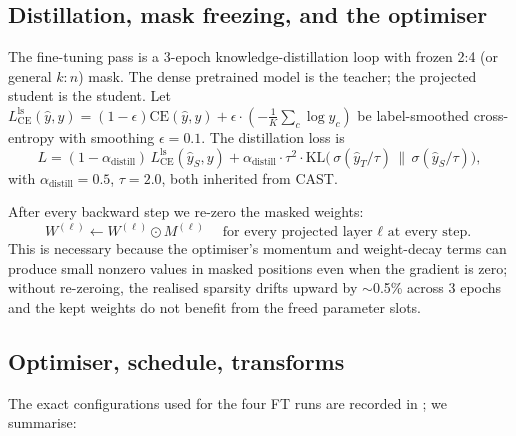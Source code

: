 \documentclass[11pt]{article}
\theoremstyle{plain}
\theoremstyle{definition}
\theoremstyle{remark}
\newcommand{\1}{\mathbf{1}}
\begin{document}
\subsection{Distillation, mask freezing, and the optimiser}

The fine-tuning pass is a 3-epoch knowledge-distillation loop with frozen 2:4 (or general $k{:}n$) mask. The dense pretrained model is the teacher; the projected student is the student. Let $L_{\mathrm{CE}}^{\mathrm{ls}}(\hat{y}, y) = (1 - \epsilon) \mathrm{CE}(\hat{y}, y) + \epsilon \cdot (-\frac1K \sum_c \log \hat{y}_c)$ be label-smoothed cross-entropy with smoothing $\epsilon = 0.1$. The distillation loss is
\begin{equation}
\label{eq:distill}
L = (1 - \alpha_{\mathrm{distill}})\, L_{\mathrm{CE}}^{\mathrm{ls}}(\hat{y}_S, y) + \alpha_{\mathrm{distill}} \cdot \tau^2 \cdot \mathrm{KL}\bigl(\,\sigma(\hat{y}_T / \tau)\, \big\|\, \sigma(\hat{y}_S / \tau)\bigr),
\end{equation}
with $\alpha_{\mathrm{distill}} = 0.5$, $\tau = 2.0$, both inherited from CAST.

After every backward step we re-zero the masked weights:
\begin{equation}
\label{eq:mask-freeze}
W^{(\ell)} \leftarrow W^{(\ell)} \odot M^{(\ell)} \quad \text{for every projected layer $\ell$ at every step.}
\end{equation}
This is necessary because the optimiser's momentum and weight-decay terms can produce small nonzero values in masked positions even when the gradient is zero; without re-zeroing, the realised sparsity drifts upward by $\sim$0.5\% across 3 epochs and the kept weights do not benefit from the freed parameter slots.

\subsection{Optimiser, schedule, transforms}
The exact configurations used for the four FT runs are recorded in ; we summarise:
\end{document}
